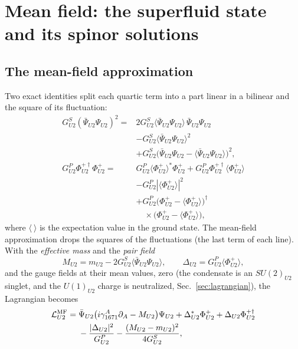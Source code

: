 \section{Mean field: the superfluid state and its spinor solutions}
\label{sec:meanfield}

\subsection{The mean-field approximation}

Two exact identities split each quartic term into a part linear in a bilinear and the square of
its fluctuation:
\begin{equation}
\begin{aligned}
G^S_{U2}(\bar\Psi_{U2}\Psi_{U2})^2={}&2G^S_{U2}\langle\bar\Psi_{U2}\Psi_{U2}\rangle\,\bar\Psi_{U2}\Psi_{U2}\\
&-G^S_{U2}\langle\bar\Psi_{U2}\Psi_{U2}\rangle^2\\
&+G^S_{U2}\big(\bar\Psi_{U2}\Psi_{U2}-\langle\bar\Psi_{U2}\Psi_{U2}\rangle\big)^2,\\
G^P_{U2}\Phi^{+\dagger}_{U2}\Phi^+_{U2}={}&G^P_{U2}\langle\Phi^+_{U2}\rangle^*\Phi^+_{U2}
+G^P_{U2}\Phi^{+\dagger}_{U2}\langle\Phi^+_{U2}\rangle\\
&-G^P_{U2}|\langle\Phi^+_{U2}\rangle|^2\\
&+G^P_{U2}\big(\Phi^+_{U2}-\langle\Phi^+_{U2}\rangle\big)^\dagger\\
&\quad\times\big(\Phi^+_{U2}-\langle\Phi^+_{U2}\rangle\big),
\end{aligned}
\label{eq:split}
\end{equation}
where $\langle\ \rangle$ is the expectation value in the ground state. The mean-field
approximation drops the squares of the fluctuations (the last term of each line). With the
\emph{effective mass} and the \emph{pair field}
\begin{equation}
M_{U2}=m_{U2}-2G^S_{U2}\langle\bar\Psi_{U2}\Psi_{U2}\rangle,\qquad
\Delta_{U2}=G^P_{U2}\langle\Phi^+_{U2}\rangle,
\label{eq:MD}
\end{equation}
and the gauge fields at their mean values, zero (the condensate is an $SU(2)_{U2}$ singlet, and
the $U(1)_{U2}$ charge is neutralized, Sec.~\ref{sec:lagrangian}), the Lagrangian becomes
\begin{equation}
\begin{aligned}
\mathcal L^{\rm MF}_{U2}={}&\bar\Psi_{U2}\big(i\gamma^A_{1671}\partial_A-M_{U2}\big)\Psi_{U2}
+\Delta^*_{U2}\Phi^+_{U2}+\Delta_{U2}\Phi^{+\dagger}_{U2}\\
&-\frac{|\Delta_{U2}|^2}{G^P_{U2}}-\frac{(M_{U2}-m_{U2})^2}{4G^S_{U2}},
\end{aligned}
\label{eq:LMF}
\end{equation}
